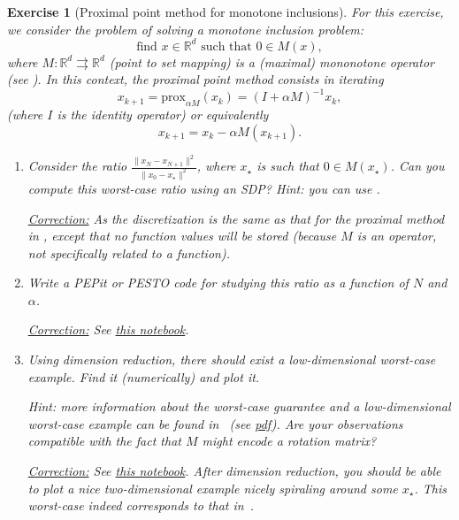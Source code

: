 \documentclass[11pt,a4paper]{article}
\newcommand{\pesto}{{PESTO }}
\newcommand{\pepit}{{PEPit }}
\newcommand{\correction}[1]{{{\color{blue}\underline{Correction:} #1}}}
\newcommand{\correction}[1]{}
\newtheorem{exercise}{Exercise}
\begin{document}
\begin{exercise}[Proximal point method for monotone inclusions]\label{ex:ppm2}
	For this exercise, we consider the problem of solving a monotone inclusion problem:
	\[ \text{find } x\in\mathbb{R}^d \text{ such that } 0\in M(x),\]
	where $M:\mathbb{R}^d\rightrightarrows {\mathbb{R}^d}$ (point to set mapping) is a (maximal) mononotone operator (see ). In this context, the proximal point method consists in iterating
	\[ x_{k+1}=\mathrm{prox}_{\alpha M}(x_k)=(I+\alpha M)^{-1} x_k,\]
(where $I$ is the identity operator) or equivalently 
	\[ x_{k+1}=x_k-\alpha M(x_{k+1}).\]
	\begin{enumerate}
	\item Consider the ratio $\frac{\|x_{N}-x_{N+1}\|^2}{\|x_0-x_\star\|^2}$, where $x_\star$ is such that $0\in M(x_\star)$. Can you compute this worst-case ratio using an SDP? Hint: you can use .
	
	\correction{As the discretization is the same as that for the proximal method in \Cref{ex:ppm}, except that no function values will be stored (because $M$ is an operator, not specifically related to a function).}
	
	\item Write a \pepit or \pesto code for studying this ratio as a function of $N$ and $\alpha$.
	
	\correction{See \href{https://github.com/PerformanceEstimation/Learning-Performance-Estimation/tree/main/Codes/Jupyter/Exercise06.ipynb}{this notebook}.}
	
	\item Using dimension reduction, there should exist a low-dimensional worst-case example. Find it (numerically) and plot it.
	
	Hint: more information about the worst-case guarantee and a low-dimensional worst-case example can be found in~\cite{gu2020tight} (see \href{https://arxiv.org/pdf/1904.05495.pdf}{pdf}). Are your observations compatible with the fact that $M$ might encode a rotation matrix?
	
	\correction{See \href{https://github.com/PerformanceEstimation/Learning-Performance-Estimation/tree/main/Codes/Jupyter/Exercise06.ipynb}{this notebook}. After dimension reduction, you should be able to plot a nice two-dimensional example nicely spiraling around some $x_\star$. This worst-case indeed corresponds to that in~\cite{gu2020tight}.}
		
	\end{enumerate}
	\end{exercise}
	
\end{document}
